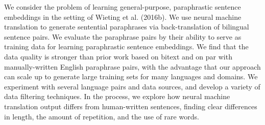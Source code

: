 We consider the problem of learning general-purpose, paraphrastic sentence embeddings in the setting of Wieting et al. (2016b). We use neural machine translation to generate sentential paraphrases via back-translation of bilingual sentence pairs. We evaluate the paraphrase pairs by their ability to serve as training data for learning paraphrastic sentence embeddings. We find that the data quality is stronger than prior work based on bitext and on par with manually-written English paraphrase pairs, with the advantage that our approach can scale up to generate large training sets for many languages and domains. We experiment with several language pairs and data sources, and develop a variety of data filtering techniques. In the process, we explore how neural machine translation output differs from human-written sentences, finding clear differences in length, the amount of repetition, and the use of rare words.
